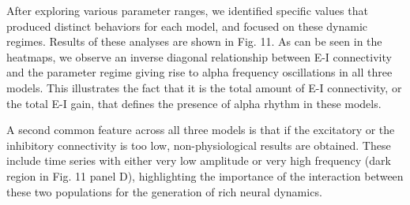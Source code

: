 \documentclass[12pt,twoside]{article}
\begin{document}
After exploring various parameter ranges, we identified specific values that produced distinct behaviors for each model, and focused on these dynamic regimes. Results of these analyses are shown in Fig. 11. As can be seen in the heatmaps, we observe an inverse diagonal relationship between E-I connectivity and the parameter regime giving rise to alpha frequency oscillations in all three models. This illustrates the fact that it is the total amount of E-I connectivity, or the total E-I gain, that defines the presence of alpha rhythm in these models.

A second common feature across all three models is that if the excitatory or the inhibitory connectivity is too low, non-physiological results are obtained. These include time series with either very low amplitude or very high frequency (dark region in Fig. 11 panel D), highlighting the importance of the interaction between these two populations for the generation of rich neural dynamics. 
\end{document}
